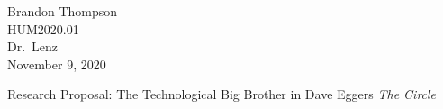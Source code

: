 \noindent
Brandon Thompson \\
HUM2020.01 \\
Dr.\ Lenz \\
November 9, 2020 \\

\begin{center}
Research Proposal: The Technological Big Brother in Dave Eggers {\it The Circle}
\end{center}